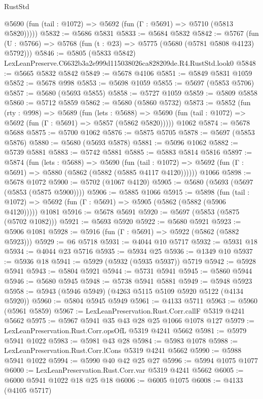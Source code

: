 \begin{lexlean}{RustStd}
\begin{coremodule}
      @5690 (fun (tail : @1072) => @5692 (fun (Γ : @5691) => @5710 (@5813 @5820)))))
@5832 := @5686 @5831
@5833 := @5684 @5832
@5842 := @5767 (fun (U : @5766) => @5768 (fun (t : @23) => @5775 (@5680 (@5781 @5808 @4123) @5792)))
@5846 := @5805 (@5833 @5842) LexLeanPreserve.C6632b3a2e999d115038026ca828209de.R4.RustStd.look0
@5848 := @5665 @5832 @5842
@5849 := @5678 @4106
@5851 := @5849 @5831 @1059
@5852 := @5678 @998
@5853 := @5698 @1059
@5855 := @5697 (@5853 @5706)
@5857 := @5680 (@5693 @5855)
@5858 := @5727 @1059
@5859 := @5809 @5858
@5860 := @5712 @5859
@5862 := @5680 (@5860 @5732)
@5873 := @5852
    (fun (rty : @998) =>
    @5689
      (fun (lets : @5688) =>
      @5690 (fun (tail : @1072) => @5692 (fun (Γ : @5691) => @5857 (@5862 @5820)))))
    @1062
@5874 := @5678 @5688
@5875 := @5700 @1062
@5876 := @5875 @5705
@5878 := @5697 (@5853 @5876)
@5880 := @5680 (@5693 @5878)
@5881 := @5096 @1062
@5882 := @5739 @5881
@5883 := @5742 @5881
@5885 := @5883 @5814 @5816
@5897 := @5874
    (fun (lets : @5688) =>
    @5690
      (fun (tail : @1072) => @5692 (fun (Γ : @5691) => @5880 (@5862 (@5882 (@5885 @4117 @4120))))))
    @1066
@5898 := @5678 @1072
@5900 := @5702 (@1067 @4120)
@5905 := @5680 (@5693 (@5697 (@5853 (@5875 @5900))))
@5906 := @5885 @1066
@5915 := @5898
    (fun (tail : @1072) => @5692 (fun (Γ : @5691) => @5905 (@5862 (@5882 (@5906 @4120)))))
    @1081
@5916 := @5678 @5691
@5920 := @5697 (@5853 (@5875 (@5702 @1082)))
@5921 := @5693 @5920
@5922 := @5680 @5921
@5923 := @5906 @1081
@5928 := @5916 (fun (Γ : @5691) => @5922 (@5862 (@5882 @5923)))
@5929 := @6 @5718
@5931 := @4044 @10 @5717
@5932 := @5931 @18
@5934 := @4044 @23 @5716
@5935 := @5934 @25
@5936 := @1349 @10
@5937 := @5936 @18
@5941 := @5929 (@5932 (@5935 @5937)) @5719
@5942 := @5928 @5941
@5943 := @5804 @5921
@5944 := @5731 @5941
@5945 := @5860 @5944
@5946 := @5680 @5945
@5948 := @5738 @5941 @5881
@5949 := @5948 @5923
@5958 := @5943 (@5946 @5949) (@4263 @5115 @5109 @5920 @5122 (@4134 @5920))
@5960 := @5804 @5945 @5949
@5961 := @4133 @5711
@5963 := @5960 (@5961 @5859)
@5967 := LexLeanPreservation.Rust.Corr.callF @5319 @4241 @5662
@5975 := @5967 @5941 @35 @43 @28 @25 @1066 @1078 @127
@5979 := LexLeanPreservation.Rust.Corr.opsOfL @5319 @4241 @5662
@5981 := @5979 @5941 @1022
@5983 := @5981 @43 @28
@5984 := @5983 @1078
@5988 := LexLeanPreservation.Rust.Corr.lCons @5319 @4241 @5662
@5990 := @5988 @5941 @1022
@5994 := @5990 @40 @42 @25 @27
@5996 := @5994 @1075 @1077
@6000 := LexLeanPreservation.Rust.Corr.var @5319 @4241 @5662
@6005 := @6000 @5941 @1022 @18 @25 @18
@6006 := @6005 @1075
@6008 := @4133 (@4105 @5717)

\end{coremodule}
\end{lexlean}
